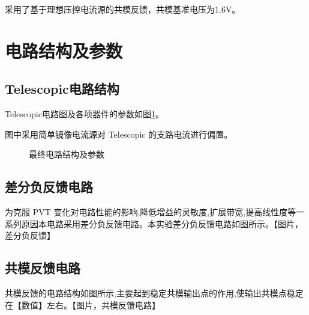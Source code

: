 \documentclass[a4paper]{article}
\newcommand{\uV}{\si{\volt}}
\begin{document}
采用了基于理想压控电流源的共模反馈，共模基准电压为$1.6\uV$。

\newpage

\section{电路结构及参数}

\subsection{Telescopic电路结构}
Telescopic电路图及各项器件的参数如图\ref{circuit}。

图中采用简单镜像电流源对 Telescopic 的支路电流进行偏置。
\begin{figure}[htb!]
  \centering
  
  \caption{最终电路结构及参数}
  \label{circuit}
\end{figure}
\subsection{差分负反馈电路}
为克服 PVT 变化对电路性能的影响,降低增益的灵敏度,扩展带宽,提高线性度等一系列原因本电路采用差分负反馈电路。本实验差分负反馈电路如图所示。【图片，差分负反馈】
\subsection{共模反馈电路}
共模反馈的电路结构如图所示,主要起到稳定共模输出点的作用,使输出共模点稳定在【数值】左右。【图片，共模反馈电路】

\newpage

\end{document}
